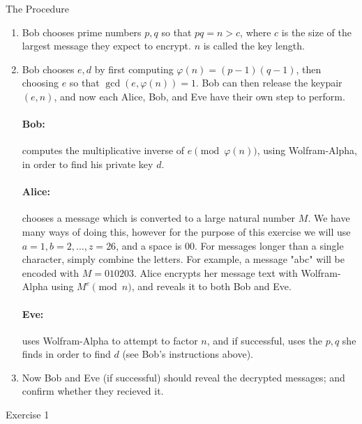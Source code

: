 \documentclass{article}
\begin{document}
    \huge The Procedure
    \normalsize
    \bigskip
    \begin{enumerate}
\item Bob chooses prime numbers $p,q$ so that $pq=n>c$, where $c$ is the size of the largest message they expect to encrypt. $n$ is called the key length.

\item Bob chooses $e,d$ by first computing $\varphi(n)=(p-1)(q-1)$, then choosing $e$ so that $\gcd(e,\varphi(n))=1$. Bob can then release the keypair $(e,n)$, and now each Alice, Bob, and Eve have their own step to perform.
    
    \paragraph{Bob:} computes the multiplicative inverse of $e\pmod{\varphi(n)}$, using Wolfram-Alpha, in order to find his private key $d$.

    \paragraph{Alice:} chooses a message which is converted to a large natural number $M$. We have many ways of doing this, however for the purpose of this exercise we will use $a=1, b=2,\dots, z=26$, and a space is $00$. For messages longer than a single character, simply combine the letters. For example, a message "abc" will be encoded with $M=010203$. Alice encrypts her message text with Wolfram-Alpha using $M^e\pmod{n}$, and reveals it to both Bob and Eve.

    \paragraph{Eve:} uses Wolfram-Alpha to attempt to factor $n$, and if successful, uses the $p,q$ she finds in order to find $d$ (see Bob's instructions above).

\item Now Bob and Eve (if successful) should reveal the decrypted messages; and confirm whether they recieved it.
\end{enumerate}

\newpage

    \huge Exercise 1
    \normalsize
\end{document}
